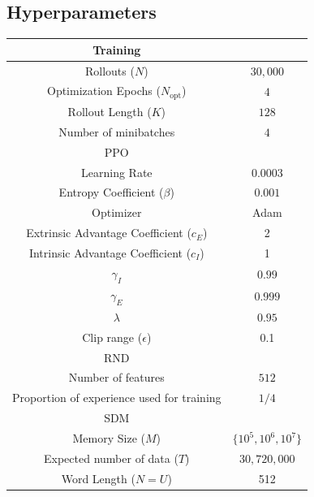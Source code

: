 \documentclass[journal, onecolumn, 12pt, draftclsnofoot]{IEEEtran}
\begin{document}
	\newpage
	\begin{appendices}
		\section{Hyperparameters}
		\label{app:hyperparameters}
		\begin{table}[ht]
		\centering
		\label{tbl:hyperparameters}
		\begin{tabular}{c |c}
			\hline
			Training & \\
			\hline
			Rollouts ($N$) & $30,000$ \\
			Optimization Epochs ($N_\text{opt}$) &  $4$\\
			Rollout Length ($K$) & $128$ \\
			Number of minibatches & $4$ \\
			\hline \hline
			PPO & \\
			\hline
			Learning Rate & $0.0003$ \\
			Entropy Coefficient ($\beta$) & $0.001$ \\
			Optimizer & Adam \\
			Extrinsic Advantage Coefficient ($c_E$) & 2 \\
			Intrinsic Advantage Coefficient ($c_I$) & 1 \\
			$\gamma_I$ & $0.99$ \\
			$\gamma_E$ & $0.999$ \\
			$\lambda$ & $0.95$ \\
			Clip range ($\epsilon$) & 0.1\\
			\hline \hline
			RND & \\
			\hline
			Number of features & $512$ \\
			Proportion of experience used for training & $1/4$ \\
			\hline \hline
			SDM & \\
			\hline
			Memory Size ($M$) & $\{10^5, 10^6, 10^7 \}$ \\
			Expected number of data ($T$) & $30,720,000$ \\
			Word Length ($N = U$) & 512\\
		\end{tabular}
		\end{table}

	\end{appendices}
	\null
  \thispagestyle{empty}%
  \newpage
	\null
\end{document}
